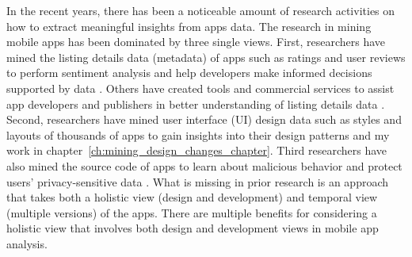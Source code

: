 In the recent years, there has been a noticeable amount of research activities on how to extract meaningful insights from apps data.
The research in mining mobile apps has been dominated by three single views.
First, researchers have mined the listing details data (metadata) of apps such as ratings and user reviews to perform sentiment analysis and help developers make informed decisions supported by data \cite{fu_2013_KDD,chen_2014_ICSE,kong_2015_CCS}. 
Others have created tools and commercial services to assist app developers and publishers in better understanding of listing details data \cite{appfigures,applause,appannie}.
Second, researchers have mined user interface (UI) design data such as styles and layouts of thousands of apps to gain insights into their design patterns \cite{shirazi_EICS_2013} and my work in chapter~\ref{ch:mining_design_changes_chapter}.
Third researchers have also mined the source code of apps to learn about malicious behavior and protect users' privacy-sensitive data \cite{zhou_2012_SP_dissecting,lu_2012_CCS,Arzt_2014_PLDI}.
What is missing in prior research is an approach that takes both a holistic view (design and development) and temporal view (multiple versions) of the apps.
There are multiple benefits for considering a holistic view that involves both design and development views in mobile app analysis.

